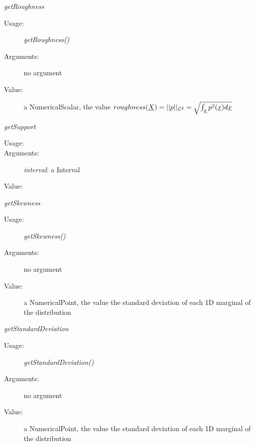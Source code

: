 \begin{description}
\begin{description}
\item \textit{getRoughness}
\begin{description}
\item[Usage:] \textit{getRoughness()}
\item[Arguments:] no argument
\item[Value:] a NumericalScalar, the value $roughness({\underline{X}}) = ||p||_{{\mathcal L}^2} = \sqrt{\int_{\underline{x}} p^2({\underline{x}})d{\underline{x}}}$
\end{description}
\bigskip

\item \textit{getSupport}
\begin{description}
\item[Usage:] \rule{0pt}{1em}
\item[Arguments:] \textit{interval}: a Interval
\item[Value:] \rule{0pt}{1em}
\end{description}
\bigskip

\item \textit{getSkewness}
\begin{description}
\item[Usage:] \textit{getSkewness()}
\item[Arguments:] no argument
\item[Value:] a NumericalPoint, the value the standard deviation of each 1D marginal of the distribution
\end{description}
\bigskip

\item \textit{getStandardDeviation}
\begin{description}
\item[Usage:] \textit{getStandardDeviation()}
\item[Arguments:] no argument
\item[Value:] a NumericalPoint, the value the standard deviation of each 1D marginal of the distribution
\end{description}
\bigskip


\end{description}
\end{description}
